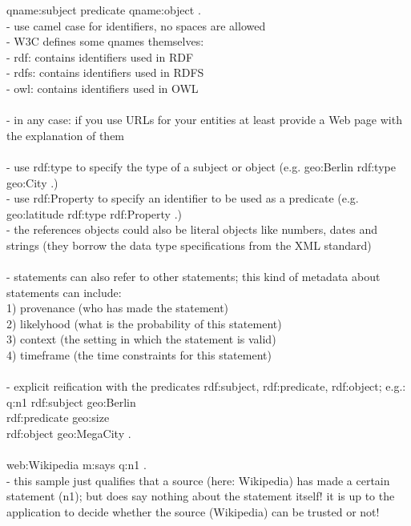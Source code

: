 	      qname:subject predicate qname:object . \\
- use camel case for identifiers, no spaces are allowed \\
- W3C defines some qnames themselves: \\
   - rdf: contains identifiers used in RDF \\
	 - rdfs: contains identifiers used in RDFS \\
	 - owl: contains identifiers used in OWL \\
\\
- in any case: if you use URLs for your entities at least provide a Web page with the explanation of them \\
\\
- use rdf:type to specify the type of a subject or object (e.g. geo:Berlin rdf:type geo:City .) \\
- use rdf:Property to specify an identifier to be used as a predicate (e.g. geo:latitude rdf:type rdf:Property .) \\
- the references objects could also be literal objects like numbers, dates and strings (they borrow the data type specifications from the XML standard)	\\
\\
- statements can also refer to other statements; this kind of metadata about statements can include: \\
  1) provenance (who has made the statement) \\
	2) likelyhood (what is the probability of this statement) \\
	3) context (the setting in which the statement is valid) \\
	4) timeframe (the time constraints for this statement) \\
\\
- explicit reification with the predicates rdf:subject, rdf:predicate, rdf:object; e.g.: \\
    q:n1 rdf:subject geo:Berlin \\
		     rdf:predicate geo:size \\
				 rdf:object geo:MegaCity . \\
\\
    web:Wikipedia m:says q:n1 .
\\
- this sample just qualifies that a source (here: Wikipedia) has made a certain statement (n1); but does say nothing about the
statement itself! it is up to the application to decide whether the source (Wikipedia) can be trusted or not! \\
